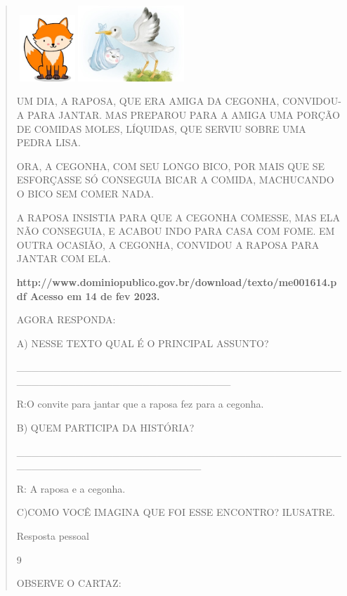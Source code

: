{{{{\begin{verse}
{{\begin{escolha}
{{{{\includegraphics[width=0.90625in,height=0.98597in]{media/image121.jpeg}\includegraphics[width=1.57292in,height=1.12292in]{media/image122.jpeg}

UM DIA, A RAPOSA, QUE ERA AMIGA DA CEGONHA, CONVIDOU-A PARA JANTAR. MAS
PREPAROU PARA A AMIGA UMA PORÇÃO DE COMIDAS MOLES, LÍQUIDAS, QUE SERVIU
SOBRE UMA PEDRA LISA.

ORA, A CEGONHA, COM SEU LONGO BICO, POR MAIS QUE SE ESFORÇASSE SÓ
CONSEGUIA BICAR A COMIDA, MACHUCANDO O BICO SEM COMER NADA.

A RAPOSA INSISTIA PARA QUE A CEGONHA COMESSE, MAS ELA NÃO CONSEGUIA, E
ACABOU INDO PARA CASA COM FOME. EM OUTRA OCASIÃO, A CEGONHA, CONVIDOU A
RAPOSA PARA JANTAR COM ELA.

\textbf{http://www.dominiopublico.gov.br/download/texto/me001614.pdf
Acesso em 14 de fev 2023.}

AGORA RESPONDA:

A) NESSE TEXTO QUAL É O PRINCIPAL ASSUNTO?

\_\_\_\_\_\_\_\_\_\_\_\_\_\_\_\_\_\_\_\_\_\_\_\_\_\_\_\_\_\_\_\_\_\_\_\_\_\_\_\_\_\_\_\_\_\_\_\_\_\_\_\_\_\_\_\_\_\_\_\_\_\_\_\_\_\_\_\_\_\_\_\_\_

R:O convite para jantar que a raposa fez para a cegonha.

B) QUEM PARTICIPA DA HISTÓRIA?

\_\_\_\_\_\_\_\_\_\_\_\_\_\_\_\_\_\_\_\_\_\_\_\_\_\_\_\_\_\_\_\_\_\_\_\_\_\_\_\_\_\_\_\_\_\_\_\_\_\_\_\_\_\_\_\_\_\_\_\_\_\_\_\_\_\_\_\_\_

R: A raposa e a cegonha.

C)COMO VOCÊ IMAGINA QUE FOI ESSE ENCONTRO? ILUSATRE.

Resposta pessoal

\num{9}

OBSERVE O CARTAZ:

}}}}
\end{escolha}}}
\end{verse}}}}}
